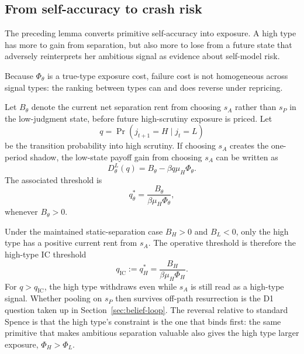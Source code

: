 \subsection{From self-accuracy to crash risk}

The preceding lemma converts primitive self-accuracy into exposure. A high type has more to gain from separation, but also more to lose from a future state that adversely reinterprets her ambitious signal as evidence about self-model risk.

Because $\Phi_\theta$ is a true-type exposure cost, failure cost is not homogeneous across signal types: the ranking between types can and does reverse under repricing.

Let $B_\theta$ denote the current net separation rent from choosing $s_A$ rather than $s_P$ in the low-judgment state, before future high-scrutiny exposure is priced. Let
\[
q=\Pr(j_{t+1}=H\mid j_t=L)
\]
be the transition probability into high scrutiny. If choosing $s_A$ creates the one-period shadow, the low-state payoff gain from choosing $s_A$ can be written as
\[
D_\theta^L(q)=B_\theta-\beta q\mu_H\Phi_\theta.
\]
The associated threshold is
\[
q_\theta^*=\frac{B_\theta}{\beta\mu_H\Phi_\theta},
\]
whenever $B_\theta>0$.

Under the maintained static-separation case \(B_H>0\) and \(B_L<0\), only the high type has a positive current rent from \(s_A\). The operative threshold is therefore the high-type IC threshold
\[
q_{\mathrm{IC}}:=q_H^*=\frac{B_H}{\beta\mu_H\Phi_H}.
\]
For \(q>q_{\mathrm{IC}}\), the high type withdraws even while \(s_A\) is still read as a high-type signal. Whether pooling on \(s_P\) then survives off-path resurrection is the D1 question taken up in Section~\ref{sec:belief-loop}. The reversal relative to standard Spence is that the high type's constraint is the one that binds first: the same primitive that makes ambitious separation valuable also gives the high type larger exposure, \(\Phi_H>\Phi_L\).
